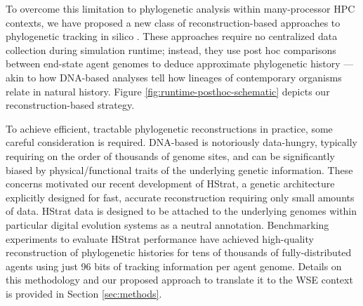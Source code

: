 To overcome this limitation to phylogenetic analysis within many-processor HPC contexts, we have proposed a new class of reconstruction-based approaches to phylogenetic tracking in silico \citep{moreno2022hereditary}.
These approaches require no centralized data collection during simulation runtime; instead, they use post hoc comparisons between end-state agent genomes to deduce approximate phylogenetic history --- akin to how DNA-based analyses tell how lineages of contemporary organisms relate in natural history.
Figure \ref{fig:runtime-posthoc-schematic} depicts our reconstruction-based strategy.

To achieve efficient, tractable phylogenetic reconstructions in practice, some careful consideration is required.
DNA-based is notoriously data-hungry, typically requiring on the order of thousands of genome sites, and can be significantly biased by physical/functional traits of the underlying genetic information.
These concerns motivated our recent development of HStrat, a genetic architecture explicitly designed for fast, accurate reconstruction requiring only small amounts of data.
HStrat data is designed to be attached to the underlying genomes within particular digital evolution systems as a neutral annotation.
Benchmarking experiments to evaluate HStrat performance have achieved high-quality reconstruction of phylogenetic histories for tens of thousands of fully-distributed agents using just 96 bits of tracking information per agent genome.
Details on this methodology and our proposed approach to translate it to the WSE context is provided in Section \ref{sec:methods}.

